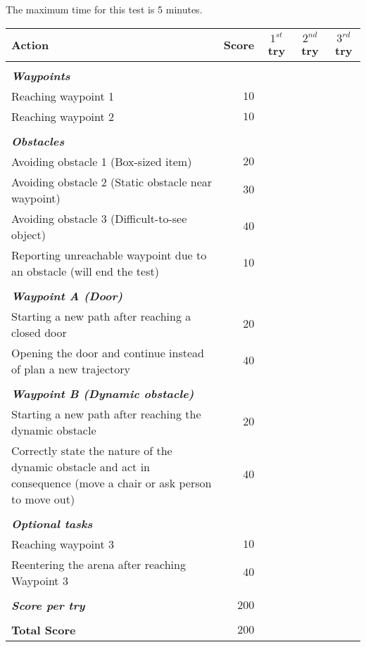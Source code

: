 
The maximum time for this test is 5 minutes.

\begin{tabularx}{\textwidth}{X r c c c }

	\textbf{Action} & \textbf{Score} & \textbf{$1^{st}$ try} & \textbf{$2^{nd}$ try} & \textbf{$3^{rd}$ try} \\ \hline
	& & & & \\ 
	\textit{\textbf{Waypoints}} \\
	Reaching waypoint 1 & $10$ & \hrulefill & \hrulefill & \hrulefill \\
	Reaching waypoint 2 & $10$ & \hrulefill & \hrulefill & \hrulefill \\ 
	& & & & \\ 
	\textit{\textbf{Obstacles}} \\
	Avoiding obstacle 1 (Box-sized item) & $20$ & \hrulefill & \hrulefill & \hrulefill \\
	Avoiding obstacle 2 (Static obstacle near waypoint) & $30$ & \hrulefill & \hrulefill & \hrulefill \\
	Avoiding obstacle 3 (Difficult-to-see object) & $40$ & \hrulefill & \hrulefill & \hrulefill \\
	Reporting unreachable waypoint due to an obstacle (will end the test) & $10$ & \hrulefill & \hrulefill & \hrulefill \\
	& & & & \\ 
	\textit{\textbf{Waypoint A (Door)}} \\
	Starting a new path after reaching a closed door & $ 20 $ & \hrulefill & \hrulefill & \hrulefill \\
	Opening the door and continue instead of plan a new trajectory & $40$ & \hrulefill & \hrulefill & \hrulefill \\
	& & & & \\ 
	\textit{\textbf{Waypoint B (Dynamic obstacle)}} \\
	Starting a new path after reaching the dynamic obstacle & $ 20 $ & \hrulefill & \hrulefill & \hrulefill \\
	Correctly state the nature of the dynamic obstacle and act in consequence (move a chair or ask person to move out) & $40$ & \hrulefill & \hrulefill & \hrulefill \\
	& & & & \\ 
	\textit{\textbf{Optional tasks}} \\
	Reaching waypoint 3 & $ 10 $ & \hrulefill & \hrulefill & \hrulefill \\
	Reentering the arena after reaching Waypoint 3 & $40$ & \hrulefill & \hrulefill & \hrulefill \\ \hline
	& & & & \\ 
	\textit{\textbf{Score per try}} & $200$ & \hrulefill & \hrulefill & \hrulefill \\ 
	& & & & \\ 
	\textbf{Total Score} & $200$ & & & \\ \cline{3-5}

\end{tabularx}\\

